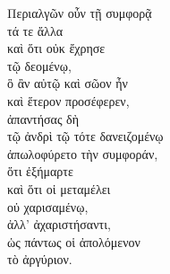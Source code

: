 
{\large
\begin{greek}
\noindent Περιαλγῶν οὖν τῇ συμφορᾷ \\
\tabto{2em} τά τε ἄλλα \\
\tabto{2em} καὶ ὅτι οὐκ ἔχρησε \\
\tabto{4em} τῷ δεομένῳ, \\
ὃ ἂν αὐτῷ καὶ σῶον ἦν \\
καὶ ἕτερον προσέφερεν, \\
ἀπαντήσας δὴ \\
\tabto{2em} τῷ ἀνδρὶ τῷ τότε δανειζομένῳ \\
ἀπωλοφύρετο τὴν συμφοράν, \\
\tabto{2em} ὅτι ἐξήμαρτε \\
\tabto{2em} καὶ ὅτι οἱ μεταμέλει \\
\tabto{4em} οὐ χαρισαμένῳ, \\
\tabto{4em} ἀλλ' ἀχαριστήσαντι, \\
\tabto{2em} ὡς πάντως οἱ ἀπολόμενον \\
\tabto{4em} τὸ ἀργύριον.\\

\end{greek}
}

